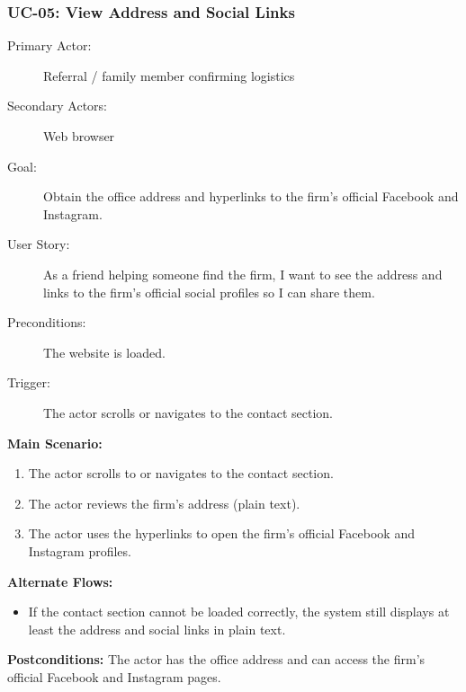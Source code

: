 \documentclass{article}
\begin{document}
\subsubsection{UC-05: View Address and Social Links}
\begin{description}
  \item[Primary Actor:] Referral / family member confirming logistics
  \item[Secondary Actors:] Web browser
  \item[Goal:] Obtain the office address and hyperlinks to the firm's official Facebook and Instagram.
  \item[User Story:] As a friend helping someone find the firm, I want to see the address and links to the firm's official social profiles so I can share them.
  \item[Preconditions:] The website is loaded.
  \item[Trigger:] The actor scrolls or navigates to the contact section.
\end{description}
\textbf{Main Scenario:}
\begin{enumerate}
  \item The actor scrolls to or navigates to the contact section.
  \item The actor reviews the firm's address (plain text).
  \item The actor uses the hyperlinks to open the firm's official Facebook and Instagram profiles.
\end{enumerate}
\textbf{Alternate Flows:}
\begin{itemize}
  \item If the contact section cannot be loaded correctly, the system still displays at least the address and social links in plain text.
\end{itemize}
\textbf{Postconditions:} The actor has the office address and can access the firm's official Facebook and Instagram pages.

\newpage
\end{document}
